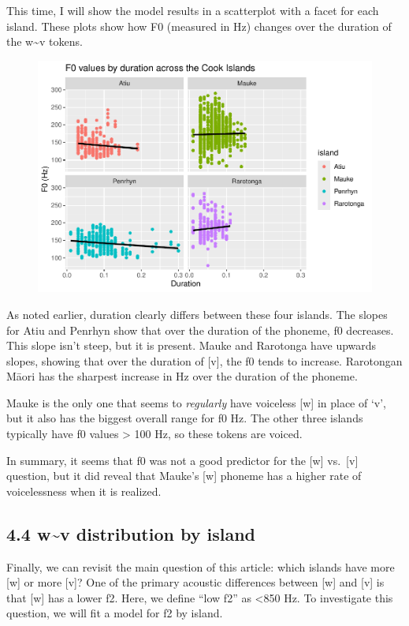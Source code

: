 \documentclass[
  ,man,floatsintext]{apa6}
\begin{document}
This time, I will show the model results in a scatterplot with a facet for each island. These plots show how F0 (measured in Hz) changes over the duration of the w\textasciitilde v tokens.

\begin{figure}
\includegraphics[width=0.75\linewidth]{D1cim_w_v_manuscript_files/figure-latex/print-modf0-1} \caption{ }\label{fig:print-modf0}
\end{figure}

As noted earlier, duration clearly differs between these four islands. The slopes for Atiu and Penrhyn show that over the duration of the phoneme, f0 decreases. This slope isn't steep, but it is present. Mauke and Rarotonga have upwards slopes, showing that over the duration of {[}v{]}, the f0 tends to increase. Rarotongan Māori has the sharpest increase in Hz over the duration of the phoneme.

Mauke is the only one that seems to \emph{regularly} have voiceless {[}w{]} in place of `v', but it also has the biggest overall range for f0 Hz. The other three islands typically have f0 values \textgreater{} 100 Hz, so these tokens are voiced.

In summary, it seems that f0 was not a good predictor for the {[}w{]} vs.~{[}v{]} question, but it did reveal that Mauke's {[}w{]} phoneme has a higher rate of voicelessness when it is realized.

\subsection{4.4 w\textasciitilde v distribution by island}\label{wv-distribution-by-island}

Finally, we can revisit the main question of this article: which islands have more {[}w{]} or more {[}v{]}? One of the primary acoustic differences between {[}w{]} and {[}v{]} is that {[}w{]} has a lower f2. Here, we define ``low f2'' as \textless850 Hz. To investigate this question, we will fit a model for f2 by island.
\end{document}
